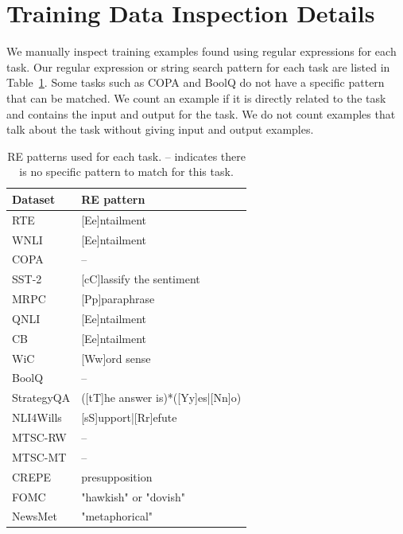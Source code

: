 \documentclass[letterpaper]{article} %
\begin{document}
\section{Training Data Inspection Details}
\label{app:inspection}
We manually inspect training examples found using regular expressions for each task. Our regular expression or string search pattern for each task are listed in Table~\ref{tab-re-patterns}. Some tasks such as COPA and BoolQ do not have a specific pattern that can be matched. We count an example if it is directly related to the task and contains the input and output for the task.  We do not count examples that talk about the task without giving input and output examples.


\begin{table}[t!]
\centering \small
\begin{tabular}{l||l}
Dataset & RE pattern  \\ \hline \hline
RTE  &  [Ee]ntailment \\
WNLI &  [Ee]ntailment \\
COPA &  -- \\
SST-2 &  [cC]lassify the sentiment\\
MRPC &  [Pp]paraphrase \\
QNLI &  [Ee]ntailment \\
CB   &  [Ee]ntailment \\
WiC &   [Ww]ord sense \\
BoolQ & -- \\
\hline \hline
StrategyQA &  ([tT]he answer is)*([Yy]es|[Nn]o) \\
NLI4Wills &  [sS]upport|[Rr]efute\\
MTSC-RW & --\\
MTSC-MT & --\\
CREPE & presupposition \\
FOMC & "hawkish" or "dovish"\\
NewsMet & "metaphorical" \\
\end{tabular}
\caption[]{RE patterns used for each task. -- indicates there is no specific pattern to match for this task.}
\label{tab-re-patterns}
\end{table}



\end{document}
